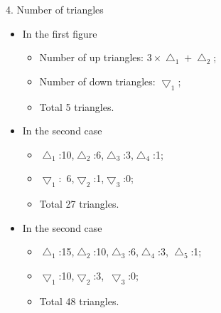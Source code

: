 \documentclass{beamer}
\begin{document}
\begin{frame}{4. Number of triangles}
  \framebreak
  \begin{itemize}
    \item  In the first figure
          \begin{itemize}
            \item Number of up
                  triangles: $3\times \bigtriangleup_1+\bigtriangleup_2$;
            \item Number of down triangles: $\bigtriangledown_1$;
            \item Total 5 triangles.
          \end{itemize}
    \item In the second case
          \begin{itemize}
            \item $\bigtriangleup_1$:10,\quad$\bigtriangleup_2$:6,\quad$\bigtriangleup_3$:3,\quad$\bigtriangleup_4$:1;
            \item $\bigtriangledown_1$:\,\,\,6,\quad$\bigtriangledown_2$:1,\quad $\bigtriangledown_3$:0;
            \item Total 27 triangles.
          \end{itemize}
    \item In the second case
          \begin{itemize}
            \item $\bigtriangleup_1$:15,\quad$\bigtriangleup_2$:10,\quad$\bigtriangleup_3$:6,\quad$\bigtriangleup_4$:3,
                  \quad$\bigtriangleup_5$:1;
            \item $\bigtriangledown_1$:10,\quad$\bigtriangledown_2$:3,\,\,\,\quad $\bigtriangledown_3$:0;
            \item Total 48 triangles.
          \end{itemize}
          \framebreak
          

\end{itemize}
\end{frame}
\end{document}
